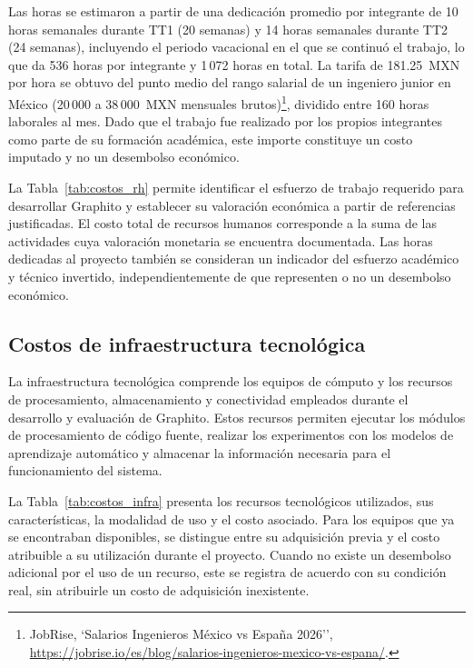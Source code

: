 Las horas se estimaron a partir de una dedicación promedio por integrante de 10 horas semanales durante TT1 (20 semanas) y 14 horas semanales durante TT2 (24 semanas), incluyendo el periodo vacacional en el que se continuó el trabajo, lo que da 536 horas por integrante y 1\,072 horas en total. La tarifa de 181.25~MXN por hora se obtuvo del punto medio del rango salarial de un ingeniero junior en México (20\,000 a 38\,000~MXN mensuales brutos)\footnote{JobRise, `Salarios Ingenieros México vs España 2026'', \url{https://jobrise.io/es/blog/salarios-ingenieros-mexico-vs-espana/}.}, dividido entre 160 horas laborales al mes. Dado que el trabajo fue realizado por los propios integrantes como parte de su formación académica, este importe constituye un costo imputado y no un desembolso económico.

La Tabla~\ref{tab:costos_rh} permite identificar el esfuerzo de trabajo requerido para desarrollar Graphito y establecer su valoración económica a partir de referencias justificadas. El costo total de recursos humanos corresponde a la suma de las actividades cuya valoración monetaria se encuentra documentada. Las horas dedicadas al proyecto también se consideran un indicador del esfuerzo académico y técnico invertido, independientemente de que representen o no un desembolso económico.

\subsection{Costos de infraestructura tecnológica}

La infraestructura tecnológica comprende los equipos de cómputo y los recursos de procesamiento, almacenamiento y conectividad empleados durante el desarrollo y evaluación de Graphito. Estos recursos permiten ejecutar los módulos de procesamiento de código fuente, realizar los experimentos con los modelos de aprendizaje automático y almacenar la información necesaria para el funcionamiento del sistema.

La Tabla~\ref{tab:costos_infra} presenta los recursos tecnológicos utilizados, sus características, la modalidad de uso y el costo asociado. Para los equipos que ya se encontraban disponibles, se distingue entre su adquisición previa y el costo atribuible a su utilización durante el proyecto. Cuando no existe un desembolso adicional por el uso de un recurso, este se registra de acuerdo con su condición real, sin atribuirle un costo de adquisición inexistente.

